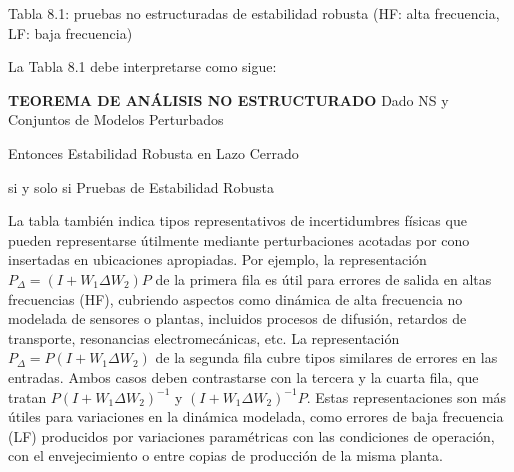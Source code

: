 
Tabla 8.1: pruebas no estructuradas de estabilidad robusta (HF: alta frecuencia, LF: baja frecuencia)

La Tabla 8.1 debe interpretarse como sigue:

\textbf{TEOREMA DE ANÁLISIS NO ESTRUCTURADO}
Dado NS y Conjuntos de Modelos Perturbados

Entonces Estabilidad Robusta en Lazo Cerrado

si y solo si Pruebas de Estabilidad Robusta

La tabla también indica tipos representativos de incertidumbres físicas que pueden representarse útilmente mediante perturbaciones acotadas por cono insertadas en ubicaciones apropiadas. Por ejemplo, la representación $P_{\Delta}=\left(I+W_{1} \Delta W_{2}\right) P$ de la primera fila es útil para errores de salida en altas frecuencias (HF), cubriendo aspectos como dinámica de alta frecuencia no modelada de sensores o plantas, incluidos procesos de difusión, retardos de transporte, resonancias electromecánicas, etc. La representación $P_{\Delta}=P\left(I+W_{1} \Delta W_{2}\right)$ de la segunda fila cubre tipos similares de errores en las entradas. Ambos casos deben contrastarse con la tercera y la cuarta fila, que tratan $P\left(I+W_{1} \Delta W_{2}\right)^{-1}$ y $\left(I+W_{1} \Delta W_{2}\right)^{-1} P$. Estas representaciones son más útiles para variaciones en la dinámica modelada, como errores de baja frecuencia (LF) producidos por variaciones paramétricas con las condiciones de operación, con el envejecimiento o entre copias de producción de la misma planta.

